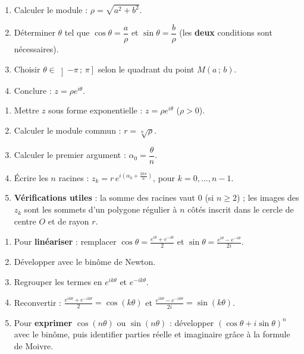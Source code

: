 \documentclass[11pt]{article}
\newcounter{popsec}
\newcounter{popsub}
\newcommand{\courssub}[1]{%
  \stepcounter{popsub}%
  \par\vspace{9pt}\noindent{\popxbold\fontsize{11.5}{13}\selectfont\color{popink}{\color{poporange}\thepopsec.\thepopsub}\hspace{6pt}#1}\par\nopagebreak\vspace{4pt}
}
\begin{document}
\courssub{Méthodes express}

\begin{methode}
\begin{enumerate}
    \item Calculer le module : $\rho = \sqrt{a^2+b^2}$.
    \item Déterminer $\theta$ tel que $\cos\theta = \dfrac{a}{\rho}$ et $\sin\theta = \dfrac{b}{\rho}$ (les \textbf{deux} conditions sont nécessaires).
    \item Choisir $\theta \in \left]-\pi\,;\,\pi\right]$ selon le quadrant du point $M(a\,;\,b)$.
    \item Conclure : $z = \rho e^{i\theta}$.
\end{enumerate}
\end{methode}

\begin{methode}
\begin{enumerate}
    \item Mettre $z$ sous forme exponentielle : $z = \rho e^{i\theta}$ ($\rho>0$).
    \item Calculer le module commun : $r = \sqrt[n]{\rho}$.
    \item Calculer le premier argument : $\alpha_0 = \dfrac{\theta}{n}$.
    \item Écrire les $n$ racines : $z_k = r \, e^{i\left(\alpha_0 + \frac{2k\pi}{n}\right)}$, pour $k=0,\dots,n-1$.
    \item \textbf{Vérifications utiles} : la somme des racines vaut $0$ (si $n\ge 2$) ; les images des $z_k$ sont les sommets d'un polygone régulier à $n$ côtés inscrit dans le cercle de centre $O$ et de rayon $r$.
\end{enumerate}
\end{methode}

\begin{methode}
\begin{enumerate}
    \item Pour \textbf{linéariser} : remplacer $\cos\theta = \frac{e^{i\theta}+e^{-i\theta}}{2}$ et $\sin\theta = \frac{e^{i\theta}-e^{-i\theta}}{2i}$.
    \item Développer avec le binôme de Newton.
    \item Regrouper les termes en $e^{ik\theta}$ et $e^{-ik\theta}$.
    \item Reconvertir : $\frac{e^{ik\theta}+e^{-ik\theta}}{2} = \cos(k\theta)$ et $\frac{e^{ik\theta}-e^{-ik\theta}}{2i} = \sin(k\theta)$.
    \item Pour \textbf{exprimer} $\cos(n\theta)$ ou $\sin(n\theta)$ : développer $(\cos\theta+i\sin\theta)^n$ avec le binôme, puis identifier parties réelle et imaginaire grâce à la formule de Moivre.
\end{enumerate}
\end{methode}
\end{document}

